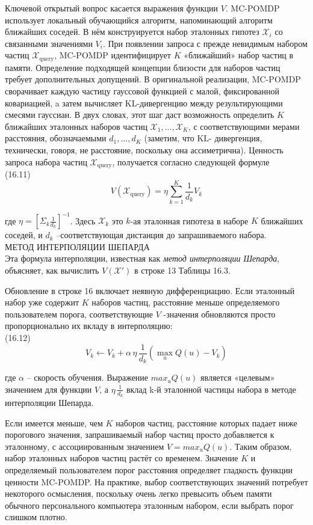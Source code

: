 \documentclass[10pt,a4paper]{article}
\begin{document}
Ключевой открытый вопрос касается выражения функции $V$. MC-POMDP использует локальный обучающийся алгоритм, напоминающий алгоритм ближайших соседей. В нём конструируется набор эталонных гипотез $\mathcal{X}_i$ со связанными значениями $V_i$. При появлении запроса с прежде невидимым набором частиц $\mathcal{X}_{\text{query}}$, MC-POMDP идентифицирует $K$ «ближайший» набор частиц в памяти. Определение подходящей концепции близости для наборов частиц требует дополнительных допущений. В оригинальной реализации, MC-POMDP сворачивает каждую частицу гауссовой функцией с малой, фиксированной ковариацией, a затем вычисляет KL-дивергенцию между результирующими смесями гауссиан. В двух словах, этот шаг даст возможность определить $K$ ближайших эталонных наборов частиц $\mathcal{X}_1,..., \mathcal{X}_K$, с соответствующими мерами расстояния, обозначаемыми $d_1,..., d_K$ (заметим, что KL- дивергенция, технически, говоря, не расстояние, поскольку она ассиметрична). Ценность запроса набора частиц $\mathcal{X}_{\text{query}}$, получается согласно следующей формуле\\

(16.11)
$$V(\mathcal{X}_{\text{query}})=\eta\sum_{k=1}^K\frac{1}{d_k}V_k$$

где $\eta=[\varSigma_k\frac{1}{d_k}]^{-1}$.   Здесь $\mathcal{X}_k$   это $k$-ая эталонная гипотеза в наборе $K$
ближайших соседей, и $d_k$ –соответствующая дистанция до запрашиваемого набора.\\

МЕТОД ИНТЕРПОЛЯЦИИ ШЕПАРДА \\
Эта формула интерполяции, известная как \textit{метод интерполяции Шепарда}, объясняет, как вычислить
$V(\mathcal{X}')$ в строке 13 Таблицы 16.3.

Обновление в строке 16 включает неявную дифференциацию. Если эталонный набор уже содержит $K$ наборов частиц, расстояние меньше определяемого пользователем порога, соответствующие $V$ -значения обновляются просто пропорционально их вкладу в интерполяцию:\\

(16.12)
$$V_k\longleftarrow V_k+\alpha\,\eta
\,\frac{1}{d_k}(\underset{u}{\max}Q(u)-V_k)$$

где $\alpha$ – скорость обучения.  Выражение $max_u  Q(u)$ является «целевым» значением для функции $V$, а $\eta
\,\frac{1}{d_k}$ вклад k-й эталонной частицы набора в методе интерполяции Шепарда.

Если имеется меньше, чем $K$ наборов частиц, расстояние которых падает ниже порогового значения, запрашиваемый набор частиц просто добавляется к эталонному, с ассоциированным значением $V = max_u Q(u)$. Таким образом, набор эталонных наборов частиц растёт со временем. Значение $K$ и определяемый пользователем порог расстояния определяет гладкость функции ценности MC-POMDP. На практике, выбор соответствующих значений потребует некоторого осмысления, поскольку очень легко превысить объем памяти обычного персонального компьютера эталонным набором, если выбрать порог слишком плотно.\\
\end{document}
